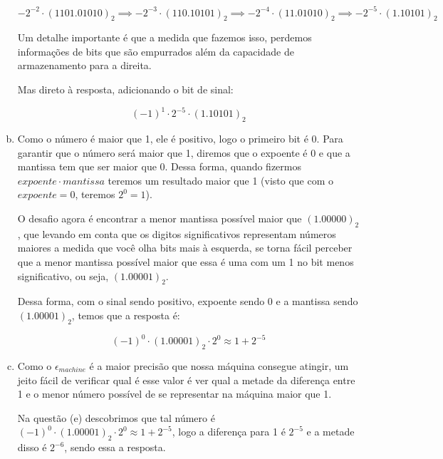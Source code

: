 \documentclass[11pt]{article}
\begin{document}
\begin{exerc}
\begin{enumerate}[a.]
$$-2^{-2} \cdot (1101.01010)_2 \implies -2^{-3} \cdot (110.10101)_2 \implies -2^{-4} \cdot (11.01010)_2 \implies -2^{-5} \cdot (1.10101)_2$$

Um detalhe importante é que a medida que fazemos isso, perdemos informações de bits que são empurrados além da capacidade de armazenamento para a direita.

Mas direto à resposta, adicionando o bit de sinal:

$$(-1)^1 \cdot 2^{-5} \cdot (1.10101)_2$$

\item
Como o número é maior que 1, ele é positivo, logo o primeiro bit é 0. Para garantir que o número será maior que 1, diremos que o expoente é 0 e que a mantissa tem que ser maior que 0. Dessa forma, quando fizermos $expoente \cdot mantissa$ teremos um resultado maior que 1 (visto que com o $expoente = 0$, teremos $2^0 = 1$).

O desafio agora é encontrar a menor mantissa possível maior que $(1.00000)_2$, que levando em conta que os digitos significativos representam números maiores a medida que você olha bits mais à esquerda, se torna fácil perceber que a menor mantissa possível maior que essa é uma com um 1 no bit menos significativo, ou seja, $(1.00001)_2$.

Dessa forma, com o sinal sendo positivo, expoente sendo 0 e a mantissa sendo $(1.00001)_2$, temos que a resposta é:

$$(-1)^0 \cdot (1.00001)_2 \cdot 2^0 \approx 1 + 2^{-5}$$

\item
Como o $\epsilon_{machine}$ é a maior precisão que nossa máquina consegue atingir, um jeito fácil de verificar qual é esse valor é ver qual a metade da diferença entre 1 e o menor número possível de se representar na máquina maior que 1.

Na questão (e) descobrimos que tal número é $(-1)^0 \cdot (1.00001)_2 \cdot 2^0 \approx 1 + 2^{-5}$, logo a diferença para 1 é $2^{-5}$ e a metade disso é $2^{-6}$, sendo essa a resposta.

\end{enumerate}
\end{exerc}
\end{document}
